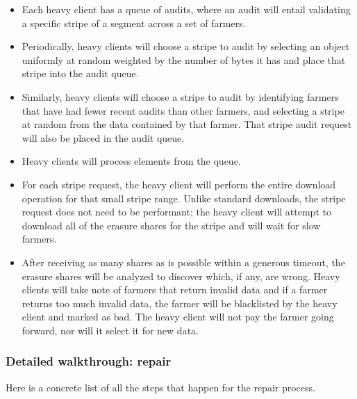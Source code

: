 \documentclass[a4paper,10pt]{article} \usepackage[utf8]{inputenc}
\begin{document}
\begin{itemize}
\item Each heavy client has a queue of audits, where an audit will entail
  validating a specific stripe of a segment across a set of farmers.
\item Periodically, heavy clients will choose a stripe to audit by selecting
  an object uniformly at random weighted by the number of bytes it has and place
  that stripe into the audit queue.
\item Similarly, heavy clients will choose a stripe to audit by identifying
  farmers that have had fewer recent audits than other farmers, and selecting
  a stripe at random from the data contained by that farmer. That stripe audit
  request will also be placed in the audit queue.
\item Heavy clients will process elements from the queue.
\item For each stripe request, the heavy client will perform the entire download
  operation for that small stripe range. Unlike standard downloads, the stripe
  request does not need to be performant; the heavy client will attempt to
  download all of the erasure shares for the stripe and will wait for slow
  farmers.
\item After receiving as many shares as is possible within a generous timeout,
  the erasure shares will be analyzed to discover which, if any, are wrong.
  Heavy clients will take note of farmers that return invalid data and if a
  farmer returns too much invalid data, the farmer will be blacklisted by the
  heavy client and marked as bad. The heavy client will not pay the farmer going
  forward, nor will it select it for new data.
\end{itemize}

\subsubsection{Detailed walkthrough: repair}

Here is a concrete list of all the steps that happen for the repair process.
\end{document}
